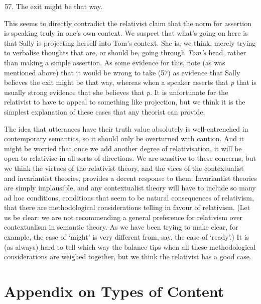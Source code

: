 \begin{enumerate}
\setcounter{enumi}{56} 
\item The exit might be that way.
\end{enumerate}

\noindent This seems to directly contradict the relativist claim that the norm for assertion is speaking truly in one's own context. We suspect that what's going on here is that Sally is projecting herself into Tom's context. She is, we think, merely trying to verbalise thoughts that are, or should be, going through \textit{Tom's} head, rather than making a simple assertion. As some evidence for this, note (as was mentioned above) that it would be wrong to take (57) as evidence that Sally believes the exit might be that way, whereas when a speaker asserts that \textit{p} that is usually strong evidence that she believes that \textit{p}. It is unfortunate for the relativist to have to appeal to something like projection, but we think it is the simplest explanation of these cases that any theorist can provide.
 
The idea that utterances have their truth value absolutely is well-entrenched in contemporary semantics, so it should only be overturned with caution. And it might be worried that once we add another degree of relativisation, it will be open to relativise in all sorts of directions. We are sensitive to these concerns, but we think the virtues of the relativist theory, and the vices of the contextualist and invariantist theories, provides a decent response to them. Invariantist theories are simply implausible, and any contextualist theory will have to include so many ad hoc conditions, conditions that seem to be natural consequences of relativism, that there are methodological considerations telling in favour of relativism. (Let us be clear: we are not recommending a general preference for relativism over contextualism in semantic theory. As we have been trying to make clear, for example, the case of `might' is very different from, say, the case of `ready'.) It is (as always) hard to tell which way the balance tips when all these methodological considerations are weighed together, but we think the relativist has a good case. 
 
 
\section*{Appendix on Types of Content} 
 
